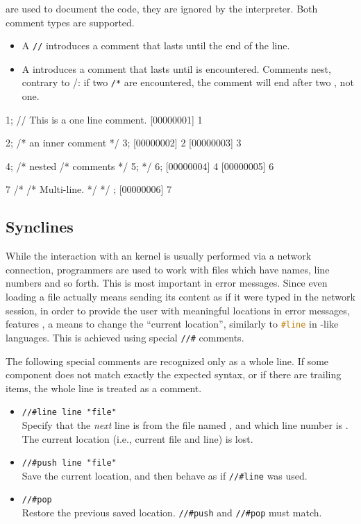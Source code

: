  are used to document the code, they are ignored by the
\us interpreter. Both \Cxx comment types are supported.

\begin{itemize}
\item A \lstinline|//| introduces a comment that lasts until the end
  of the line.
\item A \textcmt{/*} introduces a comment that lasts until \textcmt{*/} is
  encountered. Comments nest, contrary to \langC/\Cxx: if two \lstinline|/*|
  are encountered, the comment will end after two \textcmt{*/}, not one.
\end{itemize}

\begin{urbiscript}
1; // This is a one line comment.
[00000001] 1

2; /* an inner comment */ 3;
[00000002] 2
[00000003] 3

4; /* nested /* comments */ 5; */ 6;
[00000004] 4
[00000005] 6

7
  /*
    /*
       Multi-line.
    */
  */
;
[00000006] 7
\end{urbiscript}

\subsection{Synclines}
\label{sec:specs:synclines}

While the interaction with an \us kernel is usually performed via a network
connection, programmers are used to work with files which have names, line
numbers and so forth.  This is most important in error messages.  Since even
loading a file actually means sending its content as if it were typed in the
network session, in order to provide the user with meaningful locations in
error messages, \us features , a means to change
the ``current location'', similarly to \lstinline[language=C]|#line| in
\langC-like languages.  This is achieved using special \lstinline|//#| comments.

The following special comments are recognized only as a whole line.
If some component does not match exactly the expected syntax, or if
there are trailing items, the whole line is treated as a comment.
\begin{itemize}
\item \lstinline|//#line line "file"|\\
  Specify that the \emph{next} line is from the file named ,
  and which line number is .  The current location (i.e.,
  current file and line) is lost.

\item \lstinline|//#push line "file"|\\
  Save the current location, and then behave as if \lstinline|//#line|
  was used.

\item \lstinline|//#pop|\\
  Restore the previous saved location.  \lstinline|//#push| and
  \lstinline|//#pop| must match.
\end{itemize}


